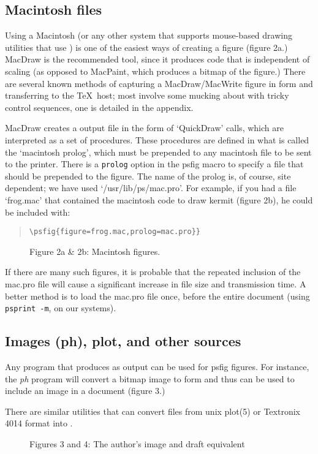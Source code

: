 \subsection{Macintosh files}
Using a Macintosh (or any other system that supports mouse-based drawing
utilities that use \Ps) is one of the easiest ways of creating
a figure (figure 2a.)
MacDraw is the recommended tool, since
it produces code that is independent of scaling (as opposed to MacPaint,
which produces a bitmap of the figure.)
There are several known methods of capturing a MacDraw/MacWrite figure
in \Ps form and transferring to the \TeX\ host; most involve some
mucking about with tricky control sequences, one is detailed in the appendix.
\par 
MacDraw creates a output file in the form of `QuickDraw' calls, which are 
interpreted as a set of \Ps procedures. These procedures are defined
in what is called the `macintosh prolog', which must be prepended 
to any macintosh file
to be sent to the printer.
There is a {\tt prolog} option in the psfig  macro to specify a file that
should be prepended to the figure. The name of the prolog is, of course,
site dependent; we have used `/usr/lib/ps/mac.pro'.
For example, if you had a file `frog.mac' that contained the macintosh
code to draw kermit (figure 2b), he could be included with:
\begin{quote}\small
{\tt\verb+\+psfig\{figure=frog.mac,prolog=mac.pro\}\}}
\end{quote}
\begin{figure}
\centerline{
\vbox{\vss{}\vss}
\hss\vbox{\vss{}\vss}}
\par
\centerline{Figure 2a \& 2b: Macintosh figures.}
\end{figure}
If there are many such figures, it is probable that the repeated inclusion
of the mac.pro file will cause a significant increase in file size and
transmission time.
A better method is to load the mac.pro file once, before the entire
document (using {\tt psprint -m}, on our systems).
\par
\subsection{Images (ph), plot, and other sources}
Any program that produces \Ps as output can be used for psfig figures.
For instance, the {\it ph} program will convert a bitmap image
to \Ps form and thus can be
used to include an image in a document (figure 3.)
\par
There are similar utilities that can convert files from unix plot(5)
or Textronix 4014 format into \Ps.
\begin{figure}
\centerline{
\vbox{\vss{}\vss}
}
\par
\centerline{Figures 3 and 4: The author's image and draft equivalent}
\end{figure}
\par
